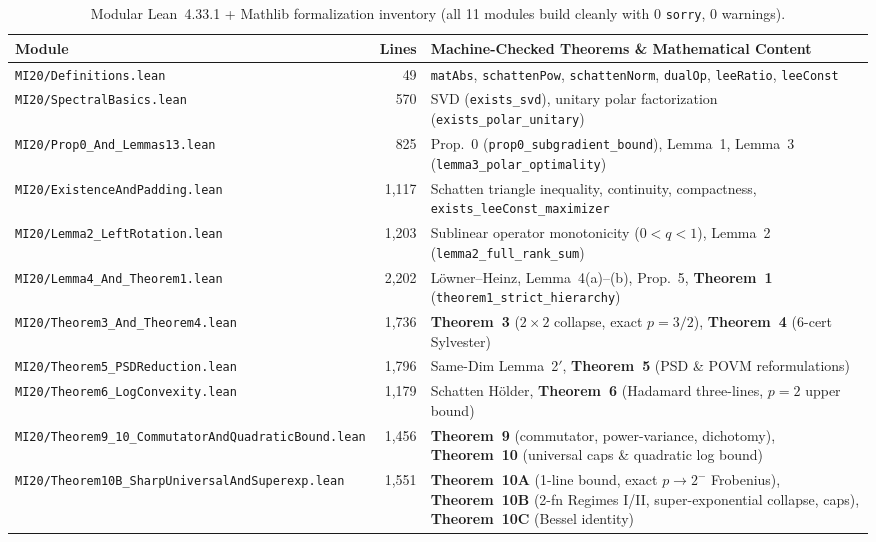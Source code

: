 \documentclass[10pt,letterpaper]{article}
\begin{document}
\begin{table}[htbp]
\centering
\caption{\small Modular Lean~4.33.1 + Mathlib formalization inventory (all 11 modules build cleanly with 0 \texttt{sorry}, 0 warnings).}
\vspace{3pt}
\footnotesize
\setlength{\tabcolsep}{4.5pt}
\begin{tabular}{@{}l r >{\raggedright\arraybackslash}p{8.4cm}@{}}
\toprule
\textbf{Module} & \textbf{Lines} & \textbf{Machine-Checked Theorems \& Mathematical Content} \\
\midrule
\texttt{MI20/Definitions.lean}           &    49 & \texttt{matAbs}, \texttt{schattenPow}, \texttt{schattenNorm}, \texttt{dualOp}, \texttt{leeRatio}, \texttt{leeConst} \\
\texttt{MI20/SpectralBasics.lean}        &   570 & SVD (\texttt{exists\_svd}), unitary polar factorization (\texttt{exists\_polar\_unitary}) \\
\texttt{MI20/Prop0\_And\_Lemmas13.lean}  &   825 & Prop.~0 (\texttt{prop0\_subgradient\_bound}), Lemma~1, Lemma~3 (\texttt{lemma3\_polar\_optimality}) \\
\texttt{MI20/ExistenceAndPadding.lean}   & 1,117 & Schatten triangle inequality, continuity, compactness, \texttt{exists\_leeConst\_maximizer} \\
\texttt{MI20/Lemma2\_LeftRotation.lean}  & 1,203 & Sublinear operator monotonicity ($0<q<1$), Lemma~2 (\texttt{lemma2\_full\_rank\_sum}) \\
\texttt{MI20/Lemma4\_And\_Theorem1.lean} & 2,202 & L\"owner--Heinz, Lemma~4(a)--(b), Prop.~5, \textbf{Theorem~1} (\texttt{theorem1\_strict\_hierarchy}) \\
\texttt{MI20/Theorem3\_And\_Theorem4.lean}& 1,736 & \textbf{Theorem~3} ($2\times 2$ collapse, exact $p=3/2$), \textbf{Theorem~4} (6-cert Sylvester) \\
\texttt{MI20/Theorem5\_PSDReduction.lean}& 1,796 & Same-Dim Lemma~2$'$, \textbf{Theorem~5} (PSD \& POVM reformulations) \\
\texttt{MI20/Theorem6\_LogConvexity.lean}& 1,179 & Schatten H\"older, \textbf{Theorem~6} (Hadamard three-lines, $p=2$ upper bound) \\
\texttt{MI20/Theorem9\_10\_CommutatorAnd\allowbreak QuadraticBound.lean} & 1,456 & \textbf{Theorem~9} (commutator, power-variance, dichotomy), \textbf{Theorem~10} (universal caps \& quadratic log bound) \\
\texttt{MI20/Theorem10B\_SharpUniversal\allowbreak AndSuperexp.lean} & 1,551 & \textbf{Theorem~10A} (1-line bound, exact $p\to 2^-$ Frobenius), \textbf{Theorem~10B} (2-fn Regimes I/II, super-exponential collapse, caps), \textbf{Theorem~10C} (Bessel identity) \\

\end{tabular}
\end{table}
\end{document}
